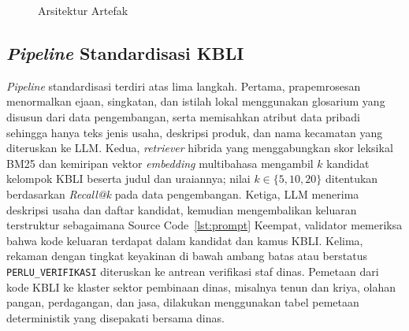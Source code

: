\documentclass[12pt,a4paper]{report}
\begin{document}
\begin{figure}[H]
  \centering
  \caption{Arsitektur Artefak}
  \label{fig:arsitektur}
\end{figure}

\subsection{\textit{Pipeline} Standardisasi KBLI}

\textit{Pipeline} standardisasi terdiri atas lima langkah. Pertama, prapemrosesan menormalkan ejaan, singkatan, dan istilah lokal menggunakan glosarium yang disusun dari data pengembangan, serta memisahkan atribut data pribadi sehingga hanya teks jenis usaha, deskripsi produk, dan nama kecamatan yang diteruskan ke LLM. Kedua, \textit{retriever} hibrida yang menggabungkan skor leksikal BM25 dan kemiripan vektor \textit{embedding} multibahasa mengambil $k$ kandidat kelompok KBLI beserta judul dan uraiannya; nilai $k \in \{5, 10, 20\}$ ditentukan berdasarkan \textit{Recall@k} pada data pengembangan. Ketiga, LLM menerima deskripsi usaha dan daftar kandidat, kemudian mengembalikan keluaran terstruktur sebagaimana Source Code~\ref{lst:prompt} Keempat, validator memeriksa bahwa kode keluaran terdapat dalam kandidat dan kamus KBLI. Kelima, rekaman dengan tingkat keyakinan di bawah ambang batas atau berstatus \texttt{PERLU\_VERIFIKASI} diteruskan ke antrean verifikasi staf dinas. Pemetaan dari kode KBLI ke klaster sektor pembinaan dinas, misalnya tenun dan kriya, olahan pangan, perdagangan, dan jasa, dilakukan menggunakan tabel pemetaan deterministik yang disepakati bersama dinas.
\end{document}
